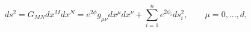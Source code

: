 \begin{equation}
ds^2 = G_{MN} dx^M dx^N = e^{2\phi} g_{\mu\nu} dx^\mu dx^\nu +
\sum_{i=1}^n e^{2\phi_i} ds_i^2, \qquad \mu=0,...,d,
\end{equation}

